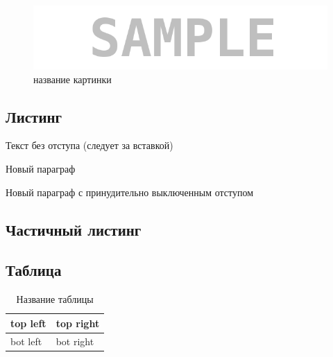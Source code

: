 \begin{figure}[H]
	\begin{center}
		\includegraphics[scale=0.7]{pics/sample}
		\caption{название картинки} 
		\label{pic:pic_name} %
	\end{center}
\end{figure}


\subsection*{Листинг}


\parindent=1cm %
Текст без отступа (следует за вставкой)

Новый параграф

\noindent Новый параграф с принудительно выключенным отступом


\subsection*{Частичный листинг}
\makeatletter
\def\lst@PlaceNumber{\llap{\normalfont
                \lst@numberstyle{\the\lst@lineno}\kern\lst@numbersep}}
\makeatother


\parindent=1cm

\subsection*{Таблица}

\begin{table}[H]
	\begin{center}
		\begin{tabular}{|l|l|}
			\hline
			top left & top right\\ \hline
			bot left & bot right\\ \hline
		\end{tabular}
		\caption{ Название таблицы}
		\label{tabular:tab_examp}
	\end{center}
\end{table}

